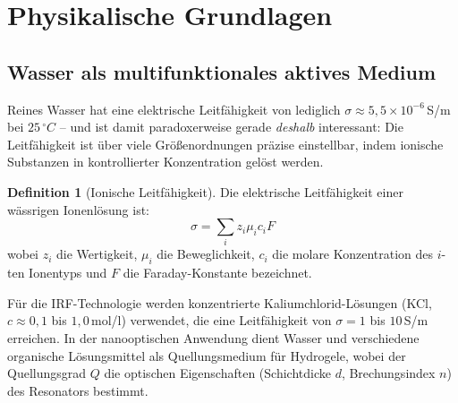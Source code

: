 ﻿\documentclass[a4paper,12pt]{scrreprt}
\theoremstyle{definition}
\newtheorem{definition}{Definition}[section]
\begin{document}
\section{Physikalische Grundlagen}

\subsection{Wasser als multifunktionales aktives Medium}

Reines Wasser hat eine elektrische Leitfähigkeit von lediglich
$\sigma \approx 5{,}5 \times 10^{-6}$\,S/m bei $25\,^{\circ}C$ -- und ist damit
paradoxerweise gerade \emph{deshalb} interessant: Die Leitfähigkeit ist
über viele Größenordnungen präzise einstellbar, indem ionische Substanzen in
kontrollierter Konzentration gelöst werden.

\begin{definition}[Ionische Leitfähigkeit]
  Die elektrische Leitfähigkeit einer wässrigen Ionenlösung ist:
  \begin{equation}
    \sigma = \sum_i z_i \mu_i c_i F
    \label{eq:leitfaehigkeit}
  \end{equation}
  wobei $z_i$ die Wertigkeit, $\mu_i$ die Beweglichkeit, $c_i$ die molare
  Konzentration des $i$-ten Ionentyps und $F$ die Faraday-Konstante bezeichnet.
\end{definition}

Für die IRF-Technologie werden konzentrierte Kaliumchlorid-Lösungen
(KCl, $c \approx 0{,}1$ bis $1{,}0$\,mol/l) verwendet, die eine Leitfähigkeit
von $\sigma = 1$ bis $10$\,S/m erreichen. In der nanooptischen Anwendung
dient Wasser und verschiedene organische Lösungsmittel als Quellungsmedium
für Hydrogele, wobei der Quellungsgrad $Q$ die optischen Eigenschaften
(Schichtdicke $d$, Brechungsindex $n$) des Resonators bestimmt.
\end{document}
